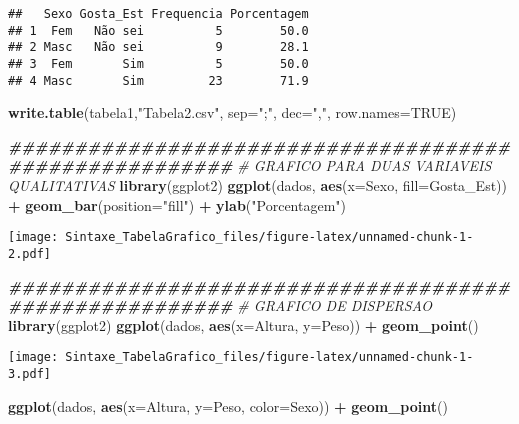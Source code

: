 \documentclass[
]{article}
\newenvironment{Shaded}{\begin{snugshade}}{\end{snugshade}}
\newcommand{\AttributeTok}[1]{\textcolor[rgb]{0.13,0.29,0.53}{#1}}
\newcommand{\CommentTok}[1]{\textcolor[rgb]{0.56,0.35,0.01}{\textit{#1}}}
\newcommand{\ConstantTok}[1]{\textcolor[rgb]{0.56,0.35,0.01}{#1}}
\newcommand{\DocumentationTok}[1]{\textcolor[rgb]{0.56,0.35,0.01}{\textbf{\textit{#1}}}}
\newcommand{\FunctionTok}[1]{\textcolor[rgb]{0.13,0.29,0.53}{\textbf{#1}}}
\newcommand{\NormalTok}[1]{#1}
\newcommand{\SpecialCharTok}[1]{\textcolor[rgb]{0.81,0.36,0.00}{\textbf{#1}}}
\newcommand{\StringTok}[1]{\textcolor[rgb]{0.31,0.60,0.02}{#1}}
\begin{document}
\begin{verbatim}
##   Sexo Gosta_Est Frequencia Porcentagem
## 1  Fem   Não sei          5        50.0
## 2 Masc   Não sei          9        28.1
## 3  Fem       Sim          5        50.0
## 4 Masc       Sim         23        71.9
\end{verbatim}

\begin{Shaded}
\begin{Highlighting}[]
\FunctionTok{write.table}\NormalTok{(tabela1,}\StringTok{"Tabela2.csv"}\NormalTok{, }\AttributeTok{sep=}\StringTok{";"}\NormalTok{, }\AttributeTok{dec=}\StringTok{","}\NormalTok{, }\AttributeTok{row.names=}\ConstantTok{TRUE}\NormalTok{)}


\DocumentationTok{\#\#\#\#\#\#\#\#\#\#\#\#\#\#\#\#\#\#\#\#\#\#\#\#\#\#\#\#\#\#\#\#\#\#\#\#\#\#\#\#\#\#\#\#\#\#\#\#\#\#\#\#\#\#\#}
\CommentTok{\# GRAFICO PARA DUAS VARIAVEIS QUALITATIVAS}
\FunctionTok{library}\NormalTok{(ggplot2)}
\FunctionTok{ggplot}\NormalTok{(dados, }\FunctionTok{aes}\NormalTok{(}\AttributeTok{x=}\NormalTok{Sexo, }\AttributeTok{fill=}\NormalTok{Gosta\_Est)) }\SpecialCharTok{+} 
  \FunctionTok{geom\_bar}\NormalTok{(}\AttributeTok{position=}\StringTok{"fill"}\NormalTok{) }\SpecialCharTok{+}
  \FunctionTok{ylab}\NormalTok{(}\StringTok{"Porcentagem"}\NormalTok{)}
\end{Highlighting}
\end{Shaded}

\texttt{[image: Sintaxe\_TabelaGrafico\_files/figure-latex/unnamed-chunk-1-2.pdf]}

\begin{Shaded}
\begin{Highlighting}[]
\DocumentationTok{\#\#\#\#\#\#\#\#\#\#\#\#\#\#\#\#\#\#\#\#\#\#\#\#\#\#\#\#\#\#\#\#\#\#\#\#\#\#\#\#\#\#\#\#\#\#\#\#\#\#\#\#\#\#\#}
\CommentTok{\# GRAFICO DE DISPERSAO}
\FunctionTok{library}\NormalTok{(ggplot2)}
\FunctionTok{ggplot}\NormalTok{(dados, }\FunctionTok{aes}\NormalTok{(}\AttributeTok{x=}\NormalTok{Altura, }\AttributeTok{y=}\NormalTok{Peso)) }\SpecialCharTok{+}
  \FunctionTok{geom\_point}\NormalTok{() }
\end{Highlighting}
\end{Shaded}

\texttt{[image: Sintaxe\_TabelaGrafico\_files/figure-latex/unnamed-chunk-1-3.pdf]}

\begin{Shaded}
\begin{Highlighting}[]
\FunctionTok{ggplot}\NormalTok{(dados, }\FunctionTok{aes}\NormalTok{(}\AttributeTok{x=}\NormalTok{Altura, }\AttributeTok{y=}\NormalTok{Peso, }\AttributeTok{color=}\NormalTok{Sexo)) }\SpecialCharTok{+}
  \FunctionTok{geom\_point}\NormalTok{() }
\end{Highlighting}
\end{Shaded}
\end{document}
